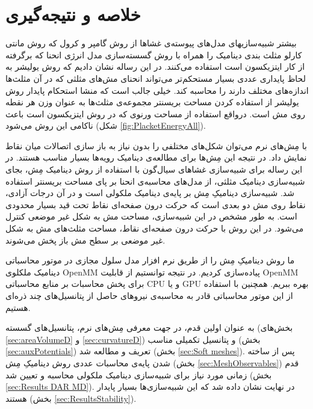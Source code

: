 \section{
خلاصه و نتیجه‌گیری
}
بیشتر شبیه‌سازیهای مدل‌های پیوسته‌ی غشاها از روش گامپر و کرول
\cite{gompper1996}
که  روش مانتی کارلو مثلث بندی دینامیک 
\cite{Boal1992PRA, Gompper1992Science}
را همراه با روش گسسته‌سازی مدل انرژی انحنا که برگرفته از کار ایتزیکسون
\cite{Itzykson1986}
است استفاده می‌کنند. در این رساله نشان دادیم که روش یولیشر
\cite{Julicher1996}
به لحاظ پایداری عددی بسیار مستحکم‌تر می‌تواند انحنای مش‌های مثلثی که در آن مثلث‌ها اندازه‌های مختلف دارند را محاسبه کند. خیلی جالب است که منشا استحکام پایدار روش یولیشر از استفاده کردن مساحت بریسنتر مجموعه‌ی مثلث‌ها به عنوان وزن هر نقطه روی مش است. درواقع استفاده از مساحت ورنوی که در روش ایتزیکسون است باعث ناکامی این روش می‌شود (شکل
\ref{fig:PlacketEnergyAll}).

با مِش‌های نرم می‌توان شکل‌های مختلفی را بدون نیاز به باز سازی اتصالات میان نقاط نمایش داد. در نتیجه این مِش‌ها برای مطالعه‌ی دینامیک رویه‌ها بسیار مناسب هستند. در این رساله برای شبیه‌سازی غشا‌های سیال‌گون با استفاده از روش دینامیک مِش، بجای شبیه‌سازی دینامیک مثلثی، از مدل‌های محاسبه‌ی انحنا بر پای مساحت بریسنتر استفاده شد. شبیه‌سازی دینامیکِ مِش بر پایه‌ی دینامیک ملکولی است و در آن درجات آزادی، نقاط روی مش دو بعدی است که حرکت درون صفحه‌ای نقاط تحت قید بسیار محدودی است. به طور مشخص در این شبیه‌سازی، مساحت‌ مش به شکل غیر موضعی کنترل می‌شود. در این روش با حرکت درون صفحه‌ای نقاط، مساحت مثلث‌های مش به شکل غیر موضعی بر سطح مش باز پخش می‌شوند. 

ما روش دینامیکِ مِش را از طریق نرم افزار مدل سلول مجازی
\cite{VCMgit}
در موتور محاسباتی دینامیک ملکلوی 
OpenMM \cite{OpenMM2017}
پیاده‌سازی کردیم. در نتیجه توانستیم از قابلیت 
OpenMM 
برای پخش محاسبات بر منابع محاسباتی 
CPU
و یا
GPU
بهره ببریم.  همچنین با استفاده از این موتور محاسباتی قادر به محاسبه‌ی نیروهای حاصل از پتانسیل‌های چند ذره‌ای هستیم.

به عنوان اولین قدم، در جهت معرفی مِش‌های نرم، پتانسیل‌های گسسته (بخش‌های
\ref{sec:areaVolumeD}
و
\ref{sec:curvatureD})
و پتانسیل‌ تکمیلی مناسب (بخش
\ref{sec:auxPotentials})
 تعریف و مطالعه شد (بخش
\ref{sec:Soft meshes}).
پس از ساخته شدن پایه‌ی محاسبات عددی روش دینامیکِ مِش (بخش
\ref{sec:MeshObservables})
 قدم زمانی مورد نیاز برای شبیه‌سازی دینامیک ملکولی محاسبه و تعیین شد (بخش
\ref{sec:Results DAR MD}).
در نهایت نشان داده شد که این شبیه‌سازی‌ها بسیار پایدار هستند (بخش
\ref{sec:ResultsStability}).

